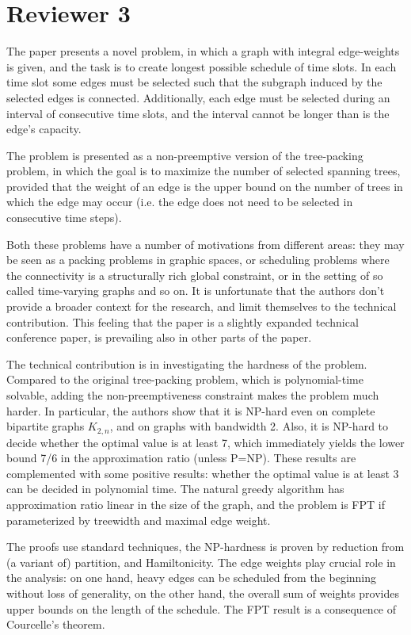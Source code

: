 \documentclass[11pt,a4paper]{article}
\begin{document}
\section*{Reviewer 3}

The paper presents a novel problem, in which a graph with integral edge-weights
is given, and the task is to create longest possible schedule of time slots. In
each time slot some edges must be selected such that the subgraph induced by
the selected edges is connected. Additionally, each edge must be selected
during an interval of consecutive time slots, and the interval cannot be longer
than is the edge's capacity.

The problem is presented as a non-preemptive version of the tree-packing
problem, in which the goal is to maximize the number of selected spanning
trees, provided that the weight of an edge is the upper bound on the number of
trees in which the edge may occur (i.e. the edge does not need to be selected
in consecutive time steps). 

Both these problems have a number of motivations from different areas: they may
be seen as a packing problems in graphic spaces, or scheduling problems where
the connectivity is a structurally rich global constraint, or in the setting of
so called time-varying graphs and so on. It is unfortunate that the authors
don't provide a broader context for the research, and limit themselves to the
technical contribution. This feeling that the paper is a slightly expanded
technical conference paper, is prevailing also in other parts of the paper.

The technical contribution is in investigating the hardness of the problem.
Compared to the original tree-packing problem, which is polynomial-time
solvable, adding the non-preemptiveness constraint makes the problem much
harder.  In particular, the authors show that it is NP-hard even on complete
bipartite graphs $K_{2,n}$, and on graphs with bandwidth 2. Also, it is NP-hard to
decide whether the optimal value is at least 7, which immediately yields the
lower bound 7/6 in the approximation ratio (unless P=NP). These results are
complemented with some positive results: whether the optimal value is at least 3
can be decided in polynomial time. The natural greedy algorithm has
approximation ratio linear in the size of the graph, and the problem is FPT if
parameterized by treewidth and maximal edge weight.

The proofs use standard techniques, the NP-hardness is proven by reduction from
(a variant of) partition, and Hamiltonicity. The edge weights play crucial role
in the analysis: on one hand, heavy edges can be scheduled from the beginning
without loss of generality, on the other hand, the overall sum of weights
provides upper bounds on the length of the schedule.  The FPT result is a
consequence of Courcelle's theorem.
\end{document}
